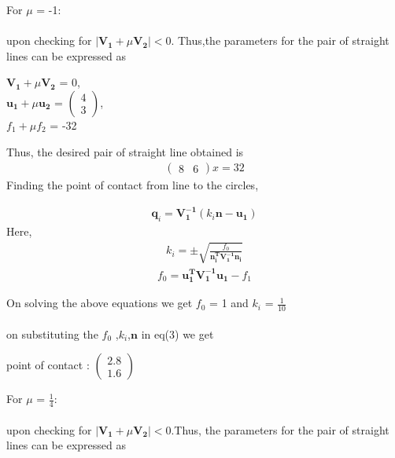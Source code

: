 \documentclass[journal,12pt,twocolumn]{IEEEtran}
\newcommand{\myvec}[1]{\ensuremath{\begin{pmatrix}#1\end{pmatrix}}}
\let\vec\mathbf
\begin{document}
For $\mu$ = -1:\\ \\
upon checking for $|\vec{V_1}+\mu\vec{V_2}|<0$. Thus,the parameters for the pair of straight lines can be expressed as \\
\begin{center}
$\vec{V_1}+\mu\vec{V_2}$ = 0, \\ 
\vspace{0.2cm}\hspace*{0.3cm}$\vec{u_1}+\mu\vec{u_2}$ = $\myvec{4 \\ 3}$, \\
\vspace{0.2cm}${f_1+\mu f_2}$ = -32 
\end{center} 
\vspace{0.2cm}
Thus, the desired pair of straight line obtained is 
\begin{align}
\myvec{8 & 6}x = 32
\end{align}
Finding the point of contact from line to the circles,

\begin{align}
\boxed{\vec{q}_i = \vec{V_1^{-1}}(k_i\vec{n-u_1})} 
\end{align}
Here, 
\begin{align}
k_i = \pm\sqrt{\frac{f_0}{\vec{n_i^TV_1^{-1}n_i}}}
\end{align}
\begin{align}
f_0 = \vec{u_1^TV_1^{-1}u_1}-f_1
\end{align}

On solving the above equations we get $f_0$ = 1 and $k_i$ = $\frac{1}{10}$\\ \\
on substituting the $f_0$ ,$k_i$,$\vec{n}$ in eq(3) we get \\
\begin{center}
point of contact : $\myvec{2.8 \\ 1.6}$
\end{center}
\vspace{0.1cm}
For $\mu$ = $\frac{1}{4}$: \\ \\
upon checking for $|\vec{V_1}+\mu\vec{V_2}|<0$.Thus, the parameters for the pair of straight lines can be expressed as \\
\end{document}
